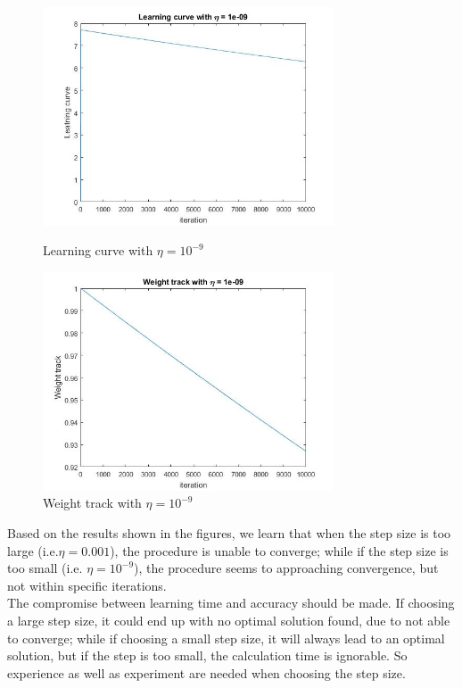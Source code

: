 \documentclass[a4paper]{article}
\begin{document}
\begin{spacing}{2.0}
	\begin{figure}[H]
	    \begin{minipage}[t]{0.5\textwidth}
	        \centering
	        \includegraphics[width=3.4in]{LC_9.jpg}
	        \caption{Learning curve with $\eta = 10^{-9}$}
	        \label{fig:side:a}
	    \end{minipage}%
	  \begin{minipage}[t]{0.5\textwidth}
	      \centering
	      \includegraphics[width=3.4in]{WT_9.jpg}
	      \caption{Weight track with $\eta = 10^{-9}$}
	      \label{fig:side:b}
	    \end{minipage}
	\end{figure}
	Based on the results shown in the figures, we learn that when the step size is too large (i.e.$\eta = 0.001$), the procedure is unable to converge; while if the step size is too small (i.e. $\eta = 10^{-9}$), the procedure seems to approaching convergence, but not within specific iterations. \\
	The compromise between learning time and accuracy should be made. If choosing a large step size, it could end up with no optimal solution found, due to not able to converge; while if choosing a small step size, it will always lead to an optimal solution, but if the step is too small, the calculation time is ignorable. So experience as well as experiment are needed when choosing the step size.



\end{spacing}
\end{document}
